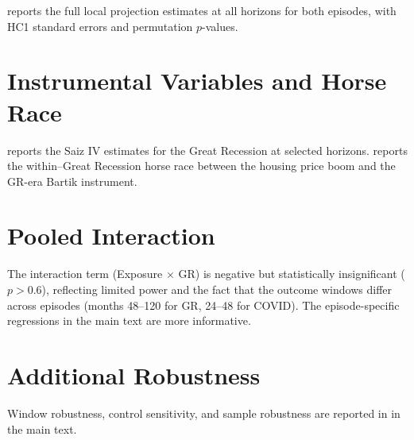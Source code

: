 \documentclass[12pt]{article}
\begin{document}
 reports the full local projection estimates at all horizons for both episodes, with HC1 standard errors and permutation $p$-values.



\section{Instrumental Variables and Horse Race}
\label{app:iv}

 reports the Saiz IV estimates for the Great Recession at selected horizons.  reports the within--Great Recession horse race between the housing price boom and the GR-era Bartik instrument.





\section{Pooled Interaction}
\label{app:pooled}



The interaction term (Exposure $\times$ GR) is negative but statistically insignificant ($p > 0.6$), reflecting limited power and the fact that the outcome windows differ across episodes (months 48--120 for GR, 24--48 for COVID). The episode-specific regressions in the main text are more informative.

\section{Additional Robustness}
\label{app:robustness}

Window robustness, control sensitivity, and sample robustness are reported in  in the main text.


\end{document}
